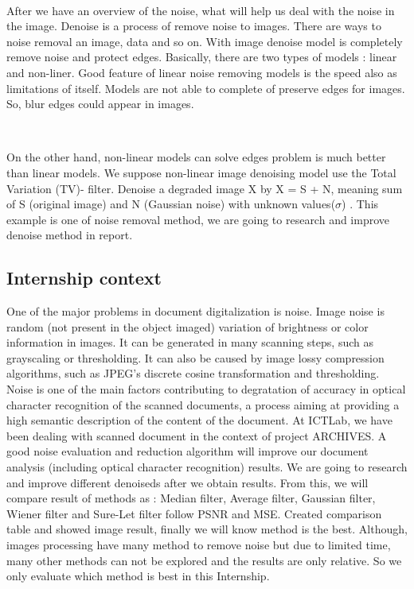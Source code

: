 \

After we have an overview of the noise, what will help us deal with the noise in the image. Denoise is a process of remove noise to images. There are ways to noise removal an image, data and so on. With image denoise model is completely remove noise and protect edges. Basically, there are two types of models : linear and non-liner. Good feature of linear noise removing models is the speed also as limitations of itself. Models are not able to complete of preserve edges for images. So, blur edges could appear in images. 

\

On the other hand, non-linear models can solve edges problem is much better than linear models. We suppose non-linear image denoising model use the Total Variation (TV)- filter. Denoise a degraded image X by X = S + N, meaning sum of S (original image) and N (Gaussian noise) with unknown values($\sigma$)
. This example is one of noise removal method, we are going to research and improve denoise method in report. 





\vspace*{1cm}




\subsection{Internship context}
One of the major problems in document digitalization is noise. Image noise is random (not present in the object imaged) variation of brightness or color information in images. It can be generated in many scanning steps, such as grayscaling or thresholding. It can also be caused by image lossy compression algorithms, such as JPEG’s discrete cosine transformation and thresholding. Noise is one of the main factors contributing to degratation of accuracy in optical character recognition of the scanned documents, a process aiming at providing a high semantic description of the content of the document. At ICTLab, we have been dealing with scanned document in the context of project ARCHIVES. A good noise evaluation and reduction algorithm will improve our document analysis (including optical character recognition) results. We are going to research and improve different denoiseds after we obtain results. From this, we will compare result of methods as : Median filter, Average filter, Gaussian filter, Wiener filter and Sure-Let filter follow PSNR and MSE. Created comparison table and showed image result, finally we will know method is the best. Although, images processing have many method to remove noise but due to limited time, many other methods can not be explored and the results are only relative. So we only evaluate which method is best in this Internship. 


